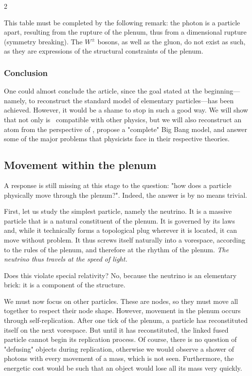 	\begin{multicols}{2}
	
	This table must be completed by the following remark: the photon is a particle apart, resulting from the rupture of the plenum, thus from a dimensional rupture (symmetry breaking). The $W^\pm$ bosons, as well as the gluon, do not exist as such, as they are expressions of the structural constraints of the plenum.
	
	\subsubsection{Conclusion}
	
	One could almost conclude the article, since the goal stated at the beginning—namely, to reconstruct the standard model of elementary particles—has been achieved. However, it would be a shame to stop in such a good way. We will show that not only is \PQ\ compatible with other physics, but we will also reconstruct an atom from the perspective of \PQ, propose a "complete" Big Bang model, and answer some of the major problems that physicists face in their respective theories.
	
	\subsection{Movement within the plenum}
	
	A response is still missing at this stage to the question: "how does a particle physically move through the plenum?". Indeed, the answer is by no means trivial.
	
	First, let us study the simplest particle, namely the neutrino. It is a massive particle that is a natural constituent of the plenum. It is governed by its laws and, while it technically forms a topological plug wherever it is located, it can move without problem. It thus screws itself naturally into a vorespace, according to the rules of the plenum, and therefore at the rhythm of the plenum. \textit{The neutrino thus travels at the speed of light.}
	
	Does this violate special relativity? No, because the neutrino is an elementary brick: it is a component of the structure.
	
	We must now focus on other particles. These are nodes, so they must move all together to respect their node shape. However, movement in the plenum occurs through self-replication. After one tick of the plenum, a particle has reconstituted itself on the next vorespace. But until it has reconstituted, the linked fused particle cannot begin its replication process. Of course, there is no question of "defusing" objects during replication, otherwise we would observe a shower of photons with every movement of a mass, which is not seen. Furthermore, the energetic cost would be such that an object would lose all its mass very quickly.
	

\end{multicols}

